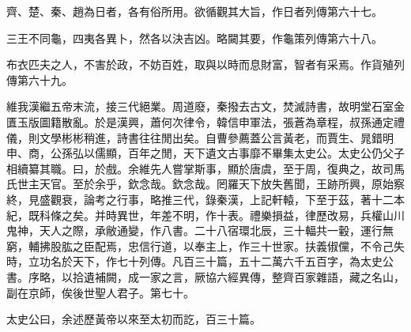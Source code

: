 齊、楚、秦、趙為日者，各有俗所用。欲循觀其大旨，作日者列傳第六十七。

三王不同龜，四夷各異卜，然各以決吉凶。略闚其要，作龜策列傳第六十八。

布衣匹夫之人，不害於政，不妨百姓，取與以時而息財富，智者有采焉。作貨殖列傳第六十九。

維我漢繼五帝末流，接三代絕業。周道廢，秦撥去古文，焚滅詩書，故明堂石室金匱玉版圖籍散亂。於是漢興，蕭何次律令，韓信申軍法，張蒼為章程，叔孫通定禮儀，則文學彬彬稍進，詩書往往閒出矣。自曹參薦蓋公言黃老，而賈生、晁錯明申、商，公孫弘以儒顯，百年之閒，天下遺文古事靡不畢集太史公。太史公仍父子相續纂其職。曰，於戲。余維先人嘗掌斯事，顯於唐虞，至于周，復典之，故司馬氏世主天官。至於余乎，欽念哉。欽念哉。罔羅天下放失舊聞，王跡所興，原始察終，見盛觀衰，論考之行事，略推三代，錄秦漢，上記軒轅，下至于茲，著十二本紀，既科條之矣。并時異世，年差不明，作十表。禮樂損益，律歷改易，兵權山川鬼神，天人之際，承敝通變，作八書。二十八宿環北辰，三十輻共一轂，運行無窮，輔拂股肱之臣配焉，忠信行道，以奉主上，作三十世家。扶義俶儻，不令己失時，立功名於天下，作七十列傳。凡百三十篇，五十二萬六千五百字，為太史公書。序略，以拾遺補闕，成一家之言，厥協六經異傳，整齊百家雜語，藏之名山，副在京師，俟後世聖人君子。第七十。

太史公曰，余述歷黃帝以來至太初而訖，百三十篇。